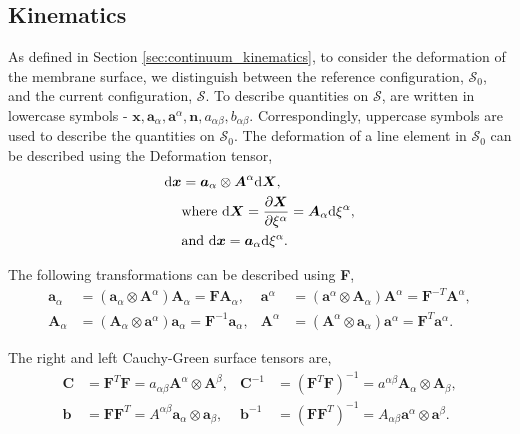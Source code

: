 \documentclass[../main.tex]{subfiles}
\begin{document}
\subsection{Kinematics}
As defined in Section \ref{sec:continuum_kinematics}, to consider the deformation of the membrane surface, we distinguish between the reference configuration,
 $\mathcal{S}_{0}$, and the current configuration, $\mathcal{S}$. To describe quantities on $\mathcal{S}$,
 are written in lowercase symbols - $\boldsymbol{x}, \boldsymbol{a}_{\alpha}, \boldsymbol{a}^{\alpha}, \boldsymbol{n}, a_{\alpha \beta}, b_{\alpha \beta}$.
 Correspondingly, uppercase symbols are used to describe the quantities on $\mathcal{S}_{0}$.
 The deformation of a line element in $\mathcal{S}_{0}$ can be described using the Deformation tensor,
\begin{equation}\label{curvy_F}
    \begin{split}
    \mathrm{d}\boldsymbol{x} &= {\boldsymbol{a}_{\alpha} \otimes \boldsymbol{A}^{\alpha}} \mathrm{d} \boldsymbol{X},\\
    &\text{where } \mathrm{d} \boldsymbol{X} = \frac{\partial \boldsymbol{X}}{\partial \xi^{\alpha}} = \boldsymbol{A}_{\alpha} \mathrm{d} \xi^{\alpha}, \notag\\
    &\text{and } \mathrm{d} \boldsymbol{x} = \boldsymbol{a}_{\alpha} \mathrm{d} \xi^{\alpha}. \notag
\end{split}
\end{equation}

The following transformations can be described using \textbf{F},
\begin{align}\label{a_and_A}
    \boldsymbol{a}_{\alpha} &= \left(\boldsymbol{a}_{\alpha} \otimes \boldsymbol{A}^{\alpha}\right) \boldsymbol{A}_{\alpha} = \boldsymbol{FA}_{\alpha},  &  \boldsymbol{a}^{\alpha} &= \left(\boldsymbol{a}^{\alpha} \otimes \boldsymbol{A}_{\alpha}\right) \boldsymbol{A}^{\alpha} = \boldsymbol{F}^{-T} \boldsymbol{A}^{\alpha},\\
    \boldsymbol{A}_{\alpha} &= \left(\boldsymbol{A}_{\alpha} \otimes \boldsymbol{a}^{\alpha}\right) \boldsymbol{a}_{\alpha} = \boldsymbol{F}^{-1} \boldsymbol{a}_{\alpha},  &   \boldsymbol{A}^{\alpha} &= \left(\boldsymbol{A}^{\alpha} \otimes \boldsymbol{a}_{\alpha}\right) \boldsymbol{a}^{\alpha} = \boldsymbol{F}^{T} \boldsymbol{a}^{\alpha}.
\end{align}

The right and left Cauchy-Green surface tensors are,
\begin{align}\label{curvy_strain}
    \boldsymbol{C} &= \boldsymbol{F}^{T} \boldsymbol{F} = a_{\alpha \beta} \boldsymbol{A}^{\alpha} \otimes \boldsymbol{A}^{\beta},   &   \boldsymbol{C}^{-1} &= (\boldsymbol{F}^{T} \boldsymbol{F})^{-1} = a^{\alpha \beta} \boldsymbol{A}_{\alpha} \otimes \boldsymbol{A}_{\beta},\\
    \boldsymbol{b} &= \boldsymbol{F} \boldsymbol{F}^{T} = A^{\alpha \beta} \boldsymbol{a}_{\alpha} \otimes \boldsymbol{a}_{\beta},  &   \boldsymbol{b}^{-1} &= (\boldsymbol{F} \boldsymbol{F}^{T})^{-1} = A_{\alpha \beta} \boldsymbol{a}^{\alpha} \otimes \boldsymbol{a}^{\beta}.
\end{align}
\end{document}
